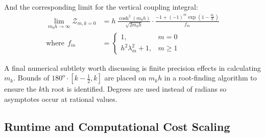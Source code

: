 \begin{appendices}

And the corresponding limit for the vertical coupling integral:
\begin{equation}
\begin{aligned}
    \lim_{m_0h\rightarrow\infty}\boldsymbol{\mathcal{Z}}_{m,k=0} &
    = h~\frac{\cosh^2(m_0h)}{\sqrt{2m_0h}}\cdot \frac{-1+(-1)^m\exp(1-\frac{d_2}{h})}{f_{m}} \\
    \text{where}~~f_m&= \begin{cases}
        1, & m=0 \\
        h^2\lambda_m^2+1, & m \geq 1
    \end{cases}
    \end{aligned}
\end{equation}

A final numerical subtlety worth discussing is finite precision effects in calculating $m_k$.
Bounds of $180^\textrm{o}\cdot[k-\frac{1}{2}, k]$ are placed on $m_kh$ in a root-finding algorithm to ensure the $k$th root is identified.
Degrees are used instead of radians so asymptotes occur at rational values.

\subsection{Runtime and Computational Cost Scaling}


\end{appendices}
